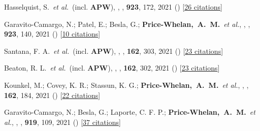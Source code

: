 \item[{\color{deemph}\scriptsize85}]Hasselquist, S.~\textit{et al.}~(incl. \textbf{APW}), , \apj, \textbf{923}, 172, 2021 () [\href{http://adsabs.harvard.edu/abs/2021ApJ...923..172H}{26 citations}]

\item[{\color{deemph}\scriptsize84}]Garavito-Camargo, N.; Patel, E.; Besla, G.; \textbf{Price-Whelan,~A.~M.}~\textit{et al.}, , \apj, \textbf{923}, 140, 2021 () [\href{http://adsabs.harvard.edu/abs/2021ApJ...923..140G}{10 citations}]

\item[{\color{deemph}\scriptsize83}]Santana, F. A.~\textit{et al.}~(incl. \textbf{APW}), , \aj, \textbf{162}, 303, 2021 () [\href{http://adsabs.harvard.edu/abs/2021AJ....162..303S}{23 citations}]

\item[{\color{deemph}\scriptsize82}]Beaton, R. L.~\textit{et al.}~(incl. \textbf{APW}), , \aj, \textbf{162}, 302, 2021 () [\href{http://adsabs.harvard.edu/abs/2021AJ....162..302B}{23 citations}]

\item[{\color{deemph}\scriptsize81}]Kounkel, M.; Covey, K. R.; Stassun, K. G.; \textbf{Price-Whelan,~A.~M.}~\textit{et al.}, , \aj, \textbf{162}, 184, 2021 () [\href{http://adsabs.harvard.edu/abs/2021AJ....162..184K}{22 citations}]

\item[{\color{deemph}\scriptsize80}]Garavito-Camargo, N.; Besla, G.; Laporte, C. F. P.; \textbf{Price-Whelan,~A.~M.}~\textit{et al.}, , \apj, \textbf{919}, 109, 2021 () [\href{http://adsabs.harvard.edu/abs/2021ApJ...919..109G}{37 citations}]

